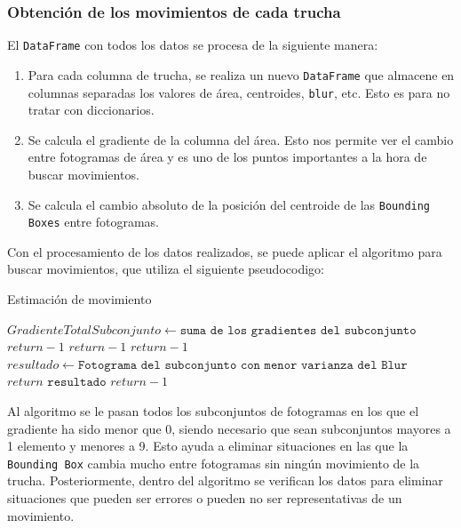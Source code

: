 \subsubsection{Obtención de los movimientos de cada trucha}

El \texttt{DataFrame} con todos los datos se procesa de la siguiente manera:
\begin{enumerate}
    \item Para cada columna de trucha, se realiza un nuevo \texttt{DataFrame} que almacene en columnas separadas los valores de área, centroides, \texttt{blur}, etc. Esto es para no tratar con diccionarios.
    \item Se calcula el gradiente de la columna del área. Esto nos permite ver el cambio entre fotogramas de área y es uno de los puntos importantes a la hora de buscar movimientos.
    \item Se calcula el cambio absoluto de la posición del centroide de las \texttt{Bounding Boxes} entre fotogramas.
\end{enumerate}

Con el procesamiento de los datos realizados, se puede aplicar el algoritmo para buscar movimientos, que utiliza el siguiente pseudocodigo:
\begin{algorithm}
    \caption{Estimación de movimiento}
\begin{algorithmic}[1]
    \State $GradienteTotalSubconjunto \gets \texttt{suma de los gradientes del subconjunto}$
        \State $return -1$
        \State $return -1$
            \State $return -1$
        \Else{$ $}
            \State $resultado \gets \texttt{Fotograma del subconjunto con menor varianza del Blur}$
            \State $return \texttt{  resultado}$
            \EndIf
    \Else{$ $}
        \State $return -1$
    \EndIf
\end{algorithmic}
\end{algorithm}\newline
Al algoritmo se le pasan todos los subconjuntos de fotogramas en los que el gradiente ha sido menor que 0, siendo necesario que sean subconjuntos mayores a 1 elemento y menores a 9. Esto ayuda a eliminar 
situaciones en las que la \texttt{Bounding Box} cambia mucho entre fotogramas sin ningún movimiento de la trucha. Posteriormente, dentro del algoritmo se verifican los datos para eliminar situaciones 
que pueden ser errores o pueden no ser representativas de un movimiento.

\clearpage
